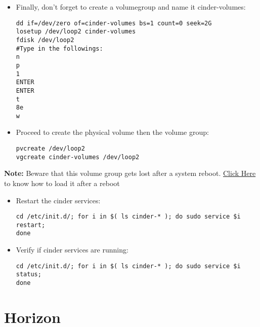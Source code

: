 \begin{itemize}
\item Finally, don't forget to create a volumegroup and name it cinder-volumes:

\begin{verbatim}
dd if=/dev/zero of=cinder-volumes bs=1 count=0 seek=2G
losetup /dev/loop2 cinder-volumes
fdisk /dev/loop2
#Type in the followings:
n
p
1
ENTER
ENTER
t
8e
w
\end{verbatim}


\item Proceed to create the physical volume then the volume group:

\begin{verbatim}
pvcreate /dev/loop2
vgcreate cinder-volumes /dev/loop2
\end{verbatim}


\end{itemize}

\textbf{Note:} Beware that this volume group gets lost after a system reboot.
\href{https://github.com/mseknibilel/OpenStack-Folsom-Install-guide/blob/master/Tricks%26Ideas/load_volume_group_after_system_reboot.rst}{Click Here} to know how to load it after a reboot

\begin{itemize}
\item Restart the cinder services:

\begin{verbatim}
cd /etc/init.d/; for i in $( ls cinder-* ); do sudo service $i restart;
done
\end{verbatim}


\item Verify if cinder services are running:

\begin{verbatim}
cd /etc/init.d/; for i in $( ls cinder-* ); do sudo service $i status;
done
\end{verbatim}


\end{itemize}

\section{Horizon}
\label{horizon}

